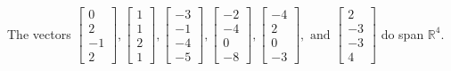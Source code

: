 \begin{exercise}
\begin{exerciseStatement}
  \end{exerciseStatement}
  \begin{exerciseAnswer}
   The vectors \(\left[\begin{array}{r}
0 \\
2 \\
-1 \\
2
\end{array}\right] , \left[\begin{array}{r}
1 \\
1 \\
2 \\
1
\end{array}\right] , \left[\begin{array}{r}
-3 \\
-1 \\
-4 \\
-5
\end{array}\right] , \left[\begin{array}{r}
-2 \\
-4 \\
0 \\
-8
\end{array}\right] , \left[\begin{array}{r}
-4 \\
2 \\
0 \\
-3
\end{array}\right] , \text{ and } \left[\begin{array}{r}
2 \\
-3 \\
-3 \\
4
\end{array}\right]\) 
  	 do  
	span \(\mathbb{R}^4\).
  


  \end{exerciseAnswer}
\end{exercise}